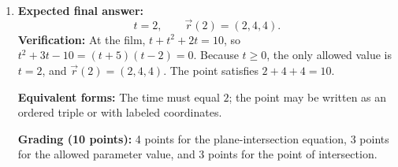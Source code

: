 \documentclass[12pt]{exam}
\begin{document}
\begin{enumerate}
\textbf{Equivalent forms:} Any affine parametrization of the same line
$x=0$, $z=-3y$ receives full credit. In particular, any nonzero scalar
multiple of the direction vector $(0,1,-3)$ is valid.

\textbf{Grading (10 points):} 4 points for a correct cross product, 2 points
for a point on both planes, and 4 points for a complete parametric equation.

\item \textbf{Expected final answer:}
\[
  t=2,\qquad \vec{r}(2)=(2,4,4).
\]
\textbf{Verification:} At the film, $t+t^2+2t=10$, so
$t^2+3t-10=(t+5)(t-2)=0$.
Because $t\geq0$, the only allowed value is $t=2$, and
$\vec{r}(2)=(2,4,4)$. The point satisfies $2+4+4=10$.

\textbf{Equivalent forms:} The time must equal $2$; the point may be written
as an ordered triple or with labeled coordinates.

\textbf{Grading (10 points):} 4 points for the plane-intersection equation,
3 points for the allowed parameter value, and 3 points for the point of
intersection.

\end{enumerate}
\end{document}
